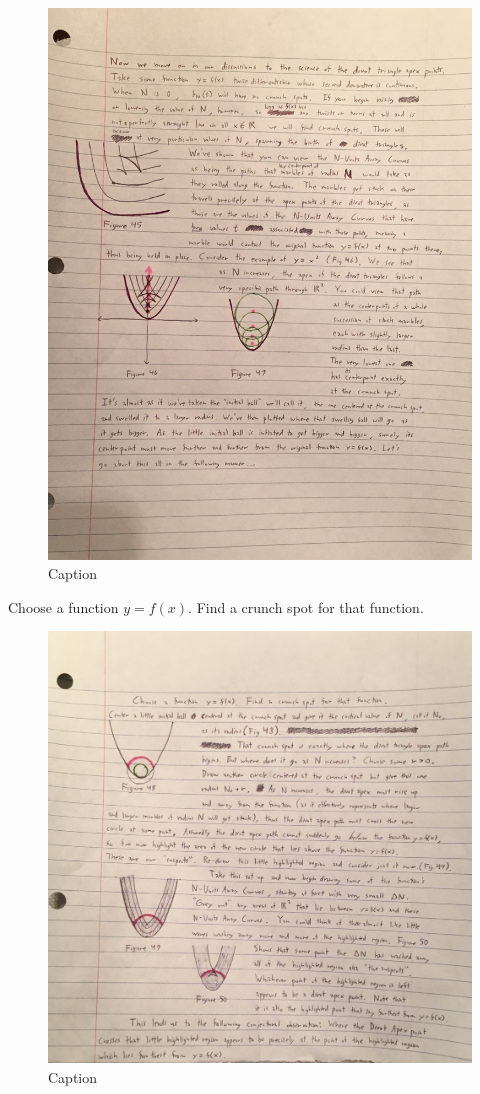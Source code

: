 \begin{figure}[H]
\begin{minipage}[b]{0.5\linewidth}
        \includegraphics[width=.9\linewidth]{solving-divot-paths-img/Fig 12-47.png}
        \caption{Caption}
        \label{fig:fig12-47}
    \end{minipage}
\end{figure}

Choose a function $y = f(x)$. Find a crunch spot for that function.

\begin{figure}
  \includegraphics[width=.9\linewidth]{solving-divot-paths-img/Fig 12-48.png}
  \caption{Caption}
  \label{fig:fig12-48}
\end{figure}

